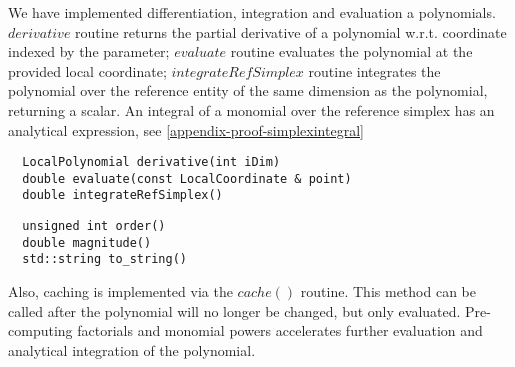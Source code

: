 \noindent
We have implemented differentiation, integration and evaluation a polynomials. $derivative$ routine returns the partial derivative of a polynomial w.r.t. coordinate indexed by the parameter; $evaluate$ routine evaluates the polynomial at the provided local coordinate; $integrateRefSimplex$ routine integrates the polynomial over the reference entity of the same dimension as the polynomial, returning a scalar. An integral of a monomial over the reference simplex has an analytical expression, see \ref{appendix-proof-simplexintegral} \\


\begin{mybox}
\begin{lstlisting}
  LocalPolynomial derivative(int iDim)
  double evaluate(const LocalCoordinate & point)
  double integrateRefSimplex()
\end{lstlisting}
\end{mybox}


\noindent

\begin{mybox}
\begin{lstlisting}
  unsigned int order()
  double magnitude()
  std::string to_string()
\end{lstlisting}
\end{mybox}

\noindent
Also, caching is implemented via the $cache()$ routine. This method can be called after the polynomial will no longer be changed, but only evaluated. Pre-computing factorials and monomial powers accelerates further evaluation and analytical integration of the polynomial.





